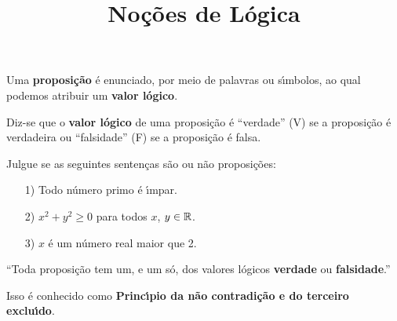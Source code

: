 \documentclass{beamer}
\title{No\c{c}\~oes de L\'ogica}
\author[\autor]{\autor}
\institute[\instituto]{\instituto}
\date{}
\begin{document}
    \begin{frame}
        \maketitle
    \end{frame}


    \begin{frame}
        \begin{definicao}
            Uma \textbf{proposi\c{c}\~ao} \'e enunciado, por meio de palavras ou s{\'\i}mbolos, ao qual podemos atribuir um \textbf{valor l\'ogico}.\pause
        \end{definicao}

        \begin{definicao}
            Diz-se que o \textbf{valor l\'ogico} de uma proposi\c{c}\~ao \'e ``verdade'' (V) se a proposi\c{c}\~ao \'e verdadeira ou ``falsidade'' (F) se a proposi\c{c}\~ao \'e falsa.
        \end{definicao}
    \end{frame}

    \begin{frame}
        \begin{exemplos}
            Julgue se as seguintes senten\c{c}as s\~ao ou n\~ao proposi\c{c}\~oes:\pause
            \begin{itemize}
                \item[1)] Todo n\'umero primo \'e {\'\i}mpar.\pause
                \item[2)] $x^2 + y^2 \ge 0$ para todos $x$, $y \in \mathbb{R}$.\pause
                \item[3)] $x$ \'e um n\'umero real maior que 2.
            \end{itemize}
        \end{exemplos}
    \end{frame}

    \begin{frame}
        \begin{center}
            ``Toda proposi\c{c}\~ao tem um, e um s\'o, dos valores l\'ogicos \textbf{verdade} ou \textbf{falsidade}.''\pause
        \end{center}
        Isso \'e conhecido como \textbf{Princ{\'\i}pio da n\~ao contradi\c{c}\~ao e do terceiro exclu{\'\i}do}.
    \end{frame}
\end{document}
